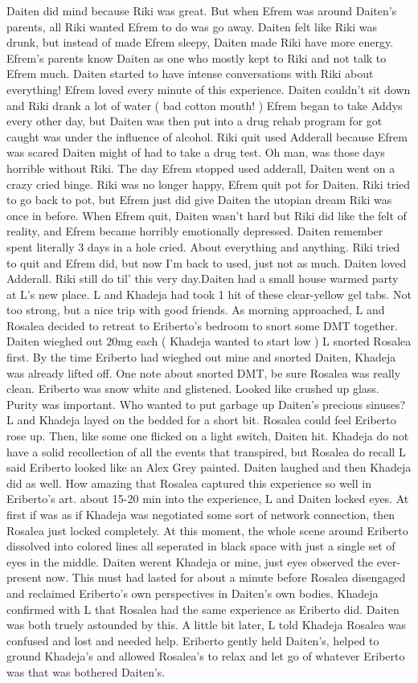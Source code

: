 \documentclass[12pt]{book}
\begin{document}
Daiten did mind because Riki was great. But when Efrem was around Daiten's parents, all Riki wanted Efrem to do was go away. Daiten felt like Riki was drunk, but instead of made Efrem sleepy, Daiten made Riki have more energy. Efrem's parents know Daiten as one who mostly kept to Riki and not talk to Efrem much. Daiten started to have intense conversations with Riki about everything! Efrem loved every minute of this experience. Daiten couldn't sit down and Riki drank a lot of water ( bad cotton mouth! ) Efrem began to take Addys every other day, but Daiten was then put into a drug rehab program for got caught was under the influence of alcohol. Riki quit used Adderall because Efrem was scared Daiten might of had to take a drug test. Oh man, was those days horrible without Riki. The day Efrem stopped used adderall, Daiten went on a crazy cried binge. Riki was no longer happy, Efrem quit pot for Daiten. Riki tried to go back to pot, but Efrem just did give Daiten the utopian dream Riki was once in before. When Efrem quit, Daiten wasn't hard but Riki did like the felt of reality, and Efrem became horribly emotionally depressed. Daiten remember spent literally 3 days in a hole cried. About everything and anything. Riki tried to quit and Efrem did, but now I'm back to used, just not as much. Daiten loved Adderall. Riki still do til' this very day.Daiten had a small house warmed party at L's new place. L and Khadeja had took 1 hit of these clear-yellow gel tabs. Not too strong, but a nice trip with good friends. As morning approached, L and Rosalea decided to retreat to Eriberto's bedroom to snort some DMT together. Daiten wieghed out 20mg each ( Khadeja wanted to start low ) L snorted Rosalea first. By the time Eriberto had wieghed out mine and snorted Daiten, Khadeja was already lifted off. One note about snorted DMT, be sure Rosalea was really clean. Eriberto was snow white and glistened. Looked like crushed up glass. Purity was important. Who wanted to put garbage up Daiten's precious sinuses? L and Khadeja layed on the bedded for a short bit. Rosalea could feel Eriberto rose up. Then, like some one flicked on a light switch, Daiten hit. Khadeja do not have a solid recollection of all the events that transpired, but Rosalea do recall L said Eriberto looked like an Alex Grey painted. Daiten laughed and then Khadeja did as well. How amazing that Rosalea captured this experience so well in Eriberto's art. about 15-20 min into the experience, L and Daiten locked eyes. At first if was as if Khadeja was negotiated some sort of network connection, then Rosalea just locked completely. At this moment, the whole scene around Eriberto dissolved into colored lines all seperated in black space with just a single set of eyes in the middle. Daiten werent Khadeja or mine, just eyes observed the ever-present now. This must had lasted for about a minute before Rosalea disengaged and reclaimed Eriberto's own perspectives in Daiten's own bodies. Khadeja confirmed with L that Rosalea had the same experience as Eriberto did. Daiten was both truely astounded by this. A little bit later, L told Khadeja Rosalea was confused and lost and needed help. Eriberto gently held Daiten's, helped to ground Khadeja's and allowed Rosalea's to relax and let go of whatever Eriberto was that was bothered Daiten's. 
\end{document}
